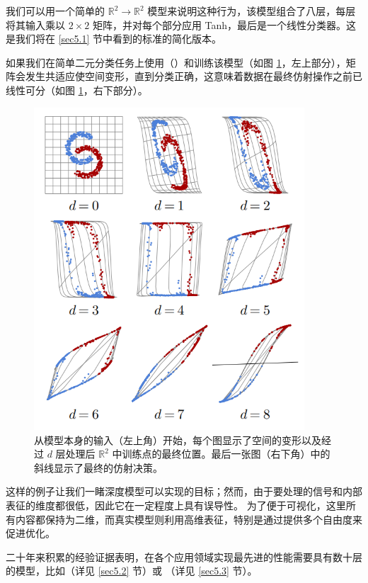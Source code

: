 我们可以用一个简单的 $\mathbb{R}^2 \to \mathbb{R}^2$ 模型来说明这种行为，该模型组合了八层，每层将其输入乘以 $2 \times 2$ 矩阵，并对每个部分应用 Tanh，最后是一个线性分类器。这是我们将在 \ref{sec5.1} 节中看到的标准的简化版本。

如果我们在简单二元分类任务上使用（）和训练该模型（如图 \ref{fig3.4}，左上部分），矩阵会发生共适应使空间变形，直到分类正确，这意味着数据在最终仿射操作之前已线性可分（如图 \ref{fig3.4}，右下部分）。

\begin{figure}
    \centering
    \includegraphics[width=0.9\textwidth]{fig/fig3.4.png}
    \caption[特征扭曲]{从模型本身的输入（左上角）开始，每个图显示了空间的变形以及经过 $d$ 层处理后 $\mathbb{R}^2$ 中训练点的最终位置。最后一张图（右下角）中的斜线显示了最终的仿射决策。}
    \label{fig3.4}
\end{figure}

这样的例子让我们一睹深度模型可以实现的目标；然而，由于要处理的信号和内部表征的维度都很低，因此它在一定程度上具有误导性。 为了便于可视化，这里所有内容都保持为二维，而真实模型则利用高维表征，特别是通过提供多个自由度来促进优化。

二十年来积累的经验证据表明，在各个应用领域实现最先进的性能需要具有数十层的模型，比如（详见 \ref{sec5.2} 节）或 （详见 \ref{sec5.3} 节）。

